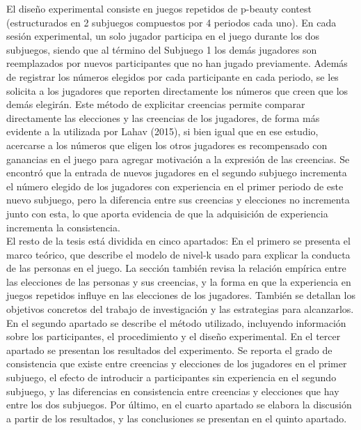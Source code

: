 El diseño experimental consiste en juegos repetidos de p-beauty contest (estructurados en 2 subjuegos compuestos por 4 periodos cada uno). En cada sesión experimental, un solo jugador participa en el juego durante los dos subjuegos, siendo que al término del Subjuego 1 los demás jugadores son reemplazados por nuevos participantes que no han jugado previamente. Además de registrar los números elegidos por cada participante en cada periodo, se les solicita a los jugadores que reporten directamente los números que creen que los demás elegirán. Este método de explicitar creencias permite comparar directamente las elecciones y las creencias de los jugadores, de forma más evidente a la utilizada por Lahav (2015), si bien igual que en ese estudio, acercarse a los números que eligen los otros jugadores es recompensado con ganancias en el juego para agregar motivación a la expresión de las creencias.
Se encontró que la entrada de nuevos jugadores en el segundo subjuego incrementa el número elegido de los jugadores con experiencia en el primer periodo de este nuevo subjuego, pero la diferencia entre sus creencias y elecciones no incrementa junto con esta, lo que aporta evidencia de que la adquisición de experiencia incrementa la consistencia.\\

El resto de la tesis está dividida en cinco apartados: En el primero se presenta el marco teórico, que describe el modelo de nivel-k usado para explicar la conducta de las personas en el juego. La sección también revisa la relación empírica entre las elecciones de las personas y sus creencias, y la forma en que la experiencia en juegos repetidos influye en las elecciones de los jugadores. También se detallan los objetivos concretos del trabajo de investigación y las estrategias para alcanzarlos. En el segundo apartado se describe el método utilizado, incluyendo información sobre los participantes, el procedimiento y el diseño experimental. En el tercer apartado se presentan los resultados del experimento. Se reporta el grado de consistencia que existe entre creencias y elecciones de los jugadores en el primer subjuego, el efecto de introducir a participantes sin experiencia en el segundo subjuego, y las diferencias en consistencia entre creencias y elecciones que hay entre los dos subjuegos. Por último, en el cuarto apartado se elabora la discusión a partir de los resultados, y las conclusiones se presentan en el quinto apartado.\\
